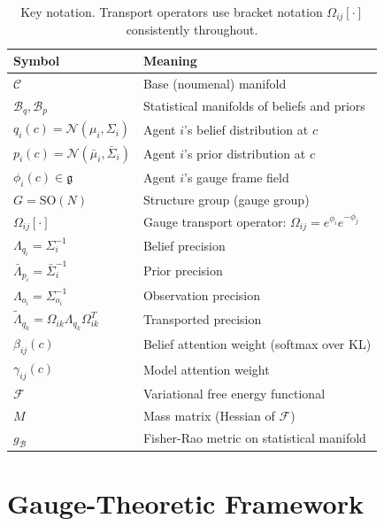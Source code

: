 \documentclass[11pt]{article}
\begin{document}
\begin{table}[h]
\centering
\small
\begin{tabular}{ll}
\toprule
\textbf{Symbol} & \textbf{Meaning} \\
\midrule
$\mathcal{C}$ & Base (noumenal) manifold \\
$\mathcal{B}_q, \mathcal{B}_p$ & Statistical manifolds of beliefs and priors \\
$q_i(c) = \mathcal{N}(\mu_i, \Sigma_i)$ & Agent $i$'s belief distribution at $c$ \\
$p_i(c) = \mathcal{N}(\bar{\mu}_i, \bar{\Sigma}_i)$ & Agent $i$'s prior distribution at $c$ \\
$\phi_i(c) \in \mathfrak{g}$ & Agent $i$'s gauge frame field \\
$G = \mathrm{SO}(N)$ & Structure group (gauge group) \\
$\Omega_{ij}[\cdot]$ & Gauge transport operator: $\Omega_{ij} = e^{\phi_i}e^{-\phi_j}$ \\
$\Lambda_{q_i} = \Sigma_i^{-1}$ & Belief precision \\
$\bar{\Lambda}_{p_i} = \bar{\Sigma}_i^{-1}$ & Prior precision \\
$\Lambda_{o_i} = \Sigma_{o_i}^{-1}$ & Observation precision \\
$\tilde{\Lambda}_{q_k} = \Omega_{ik}\Lambda_{q_k}\Omega_{ik}^T$ & Transported precision \\
$\beta_{ij}(c)$ & Belief attention weight (softmax over KL) \\
$\gamma_{ij}(c)$ & Model attention weight \\
$\mathcal{F}$ & Variational free energy functional \\
$M$ & Mass matrix (Hessian of $\mathcal{F}$) \\
$g_{\mathcal{B}}$ & Fisher-Rao metric on statistical manifold \\
\bottomrule
\end{tabular}
\caption{Key notation. Transport operators use bracket notation $\Omega_{ij}[\cdot]$ consistently throughout.}
\label{tab:notation}
\end{table}

\section{Gauge-Theoretic Framework}
\label{sec:framework}
\end{document}
